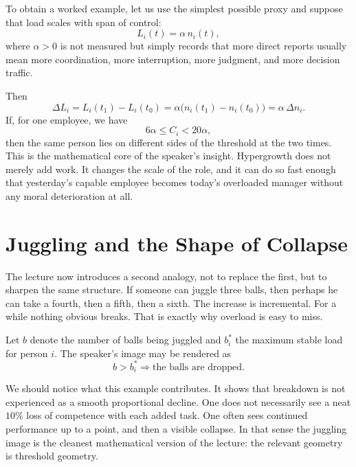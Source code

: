 To obtain a worked example, let us use the simplest possible proxy and suppose that load scales with span of control:
\begin{equation}
L_i(t) = \alpha\, n_i(t),
\end{equation}
where \(\alpha>0\) is not measured but simply records that more direct reports usually mean more coordination, more interruption, more judgment, and more decision traffic.

Then
\begin{equation}
\Delta L_i = L_i(t_1)-L_i(t_0)=\alpha\bigl(n_i(t_1)-n_i(t_0)\bigr)=\alpha\,\Delta n_i.
\end{equation}
If, for one employee, we have
\begin{equation}
6\alpha \le C_i < 20\alpha,
\end{equation}
then the same person lies on different sides of the threshold at the two times. This is the mathematical core of the speaker's insight. Hypergrowth does not merely add work. It changes the scale of the role, and it can do so fast enough that yesterday's capable employee becomes today's overloaded manager without any moral deterioration at all.

\section{Juggling and the Shape of Collapse}

The lecture now introduces a second analogy, not to replace the first, but to sharpen the same structure. If someone can juggle three balls, then perhaps he can take a fourth, then a fifth, then a sixth. The increase is incremental. For a while nothing obvious breaks. That is exactly why overload is easy to miss.

Let \(b\) denote the number of balls being juggled and \(b_i^\ast\) the maximum stable load for person \(i\). The speaker's image may be rendered as
\begin{equation}
b > b_i^\ast \Longrightarrow \text{the balls are dropped.}
\end{equation}

We should notice what this example contributes. It shows that breakdown is not experienced as a smooth proportional decline. One does not necessarily see a neat \(10\%\) loss of competence with each added task. One often sees continued performance up to a point, and then a visible collapse. In that sense the juggling image is the cleanest mathematical version of the lecture: the relevant geometry is threshold geometry.

